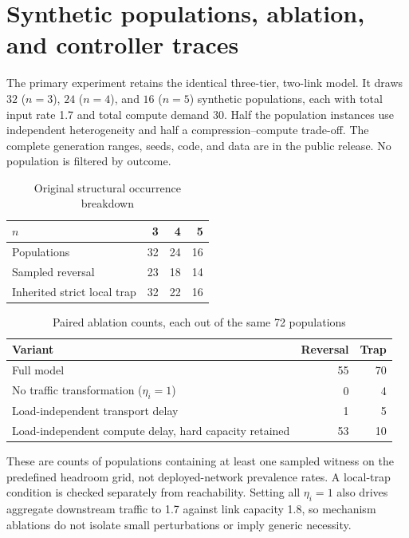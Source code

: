 \documentclass[10pt,a4paper]{article}
\begin{document}
\section{Synthetic populations, ablation, and controller traces}\label{sec:experiments}
The primary experiment retains the identical three-tier, two-link model. It draws $32$ ($n=3$), $24$ ($n=4$), and $16$ ($n=5$) synthetic populations, each with total input rate 1.7 and total compute demand 30. Half the population instances use independent heterogeneity and half a compression--compute trade-off. The complete generation ranges, seeds, code, and data are in the public release. No population is filtered by outcome.
\begin{table}[h]\centering\small
\caption{Original structural occurrence breakdown}\begin{tabular}{lrrr}\toprule
$n$ &3&4&5\\\midrule
Populations &32&24&16\\
Sampled reversal &23&18&14\\
Inherited strict local trap &32&22&16\\\bottomrule
\end{tabular}\end{table}
\begin{table}[h]\centering\small
\caption{Paired ablation counts, each out of the same 72 populations}\begin{tabular}{lrr}\toprule
Variant & Reversal & Trap\\\midrule
Full model &55&70\\
No traffic transformation ($\eta_i=1$)&0&4\\
Load-independent transport delay&1&5\\
Load-independent compute delay, hard capacity retained&53&10\\\bottomrule
\end{tabular}\end{table}
These are counts of populations containing at least one sampled witness on the predefined headroom grid, not deployed-network prevalence rates. A local-trap condition is checked separately from reachability. Setting all $\eta_i=1$ also drives aggregate downstream traffic to 1.7 against link capacity 1.8, so mechanism ablations do not isolate small perturbations or imply generic necessity.
\end{document}
